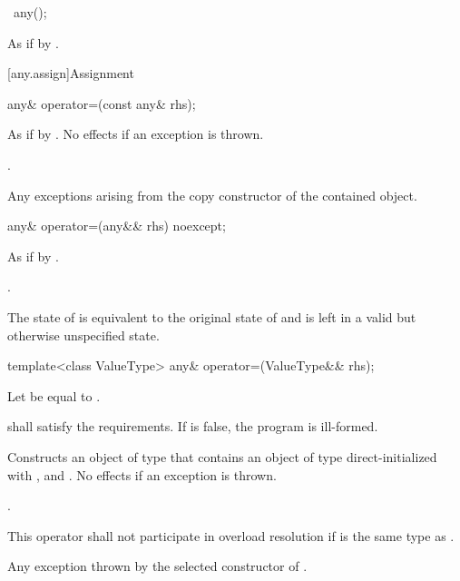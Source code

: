 \begin{itemdecl}
~any();
\end{itemdecl}

\begin{itemdescr}
\pnum
\effects
As if by .
\end{itemdescr}

[any.assign]{Assignment}

%
\begin{itemdecl}
any& operator=(const any& rhs);
\end{itemdecl}

\begin{itemdescr}
\pnum
\effects
As if by .
No effects if an exception is thrown.

\pnum
\returns
{}.

\pnum
\throws
Any exceptions arising from the copy constructor of the contained object.
\end{itemdescr}

%
\begin{itemdecl}
any& operator=(any&& rhs) noexcept;
\end{itemdecl}

\begin{itemdescr}
\pnum
\effects
As if by .

\pnum
\returns
{}.

\pnum
\postconditions
The state of  is equivalent to the original state of 
and  is left in a valid but otherwise unspecified state.
\end{itemdescr}

%
\begin{itemdecl}
template<class ValueType>
any& operator=(ValueType&& rhs);
\end{itemdecl}

\begin{itemdescr}
\pnum
Let  be equal to .

\pnum
\requires
{} shall satisfy the  requirements.
If  is false, the program is ill-formed.

\pnum
\effects
Constructs an object  of type  that contains an object of type  direct-initialized with , and .
No effects if an exception is thrown.

\pnum
\returns
{}.

\pnum
\remarks
This operator shall not participate in overload resolution if  is the same type as .

\pnum
\throws
Any exception thrown by the selected constructor of .
\end{itemdescr}

